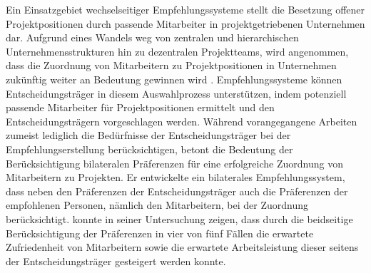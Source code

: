 Ein Einsatzgebiet wechselseitiger Empfehlungssysteme stellt die Besetzung offener Projektpositionen durch passende Mitarbeiter in projektgetriebenen Unternehmen dar.
Aufgrund eines Wandels weg von zentralen und hierarchischen Unternehmensstrukturen hin zu dezentralen Projektteams, wird angenommen, dass die Zuordnung von Mitarbeitern zu Projektpositionen in Unternehmen zukünftig weiter an Bedeutung gewinnen wird \cite[S .iii]{link:booklet}. %
Empfehlungssysteme können Entscheidungsträger in diesem Auswahlprozess unterstützen, indem potenziell passende Mitarbeiter für Projektpositionen ermittelt und den Entscheidungsträgern vorgeschlagen werden.
Während vorangegangene Arbeiten zumeist lediglich die Bedürfnisse der Entscheidungsträger bei der Empfehlungserstellung berücksichtigen, betont \textcite[S. iii]{link:booklet} die Bedeutung der Berücksichtigung bilateralen Präferenzen für eine erfolgreiche Zuordnung von Mitarbeitern zu Projekten.
Er entwickelte ein bilaterales Empfehlungssystem, dass neben den Präferenzen der Entscheidungsträger auch die Präferenzen der empfohlenen Personen, nämlich den Mitarbeitern, bei der Zuordnung berücksichtigt.
\textcite[S. iii]{link:booklet} konnte in seiner Untersuchung zeigen, dass durch die beidseitige Berücksichtigung der Präferenzen in vier von fünf Fällen die erwartete Zufriedenheit von Mitarbeitern sowie die erwartete Arbeitsleistung dieser seitens der Entscheidungsträger gesteigert werden konnte.

